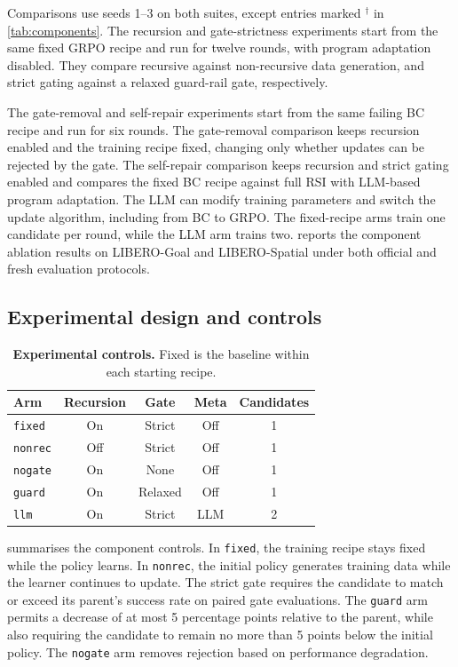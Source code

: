Comparisons use seeds 1--3 on both suites, except entries marked $^\dagger$ in \cref{tab:components}. The recursion and gate-strictness experiments start from the same fixed GRPO recipe and run for twelve rounds, with program adaptation disabled. They compare recursive against non-recursive data generation, and strict gating against a relaxed guard-rail gate, respectively.

The gate-removal and self-repair experiments start from the same failing BC recipe and run for six rounds. The gate-removal comparison keeps recursion enabled and the training recipe fixed, changing only whether updates can be rejected by the gate. The self-repair comparison keeps recursion and strict gating enabled and compares the fixed BC recipe against full RSI with LLM-based program adaptation. The LLM can modify training parameters and switch the update algorithm, including from BC to GRPO. The fixed-recipe arms train one candidate per round, while the LLM arm trains two.  reports the component ablation results on LIBERO-Goal and LIBERO-Spatial under both official and fresh evaluation protocols.

\subsection{Experimental design and controls}
\label{sec:controls}
\begin{table}[t]
\centering
\footnotesize
\caption{\textbf{Experimental controls.}
Fixed is the baseline within each starting recipe.}
\label{tab:controls}
\setlength{\tabcolsep}{5pt}
\renewcommand{\arraystretch}{1.15}
\begin{tabular}{@{}lcccc@{}}
\toprule
Arm & Recursion & Gate & Meta & Candidates \\
\midrule
\texttt{fixed}  & On  & Strict  & Off & 1 \\
\texttt{nonrec} & Off & Strict  & Off & 1 \\
\texttt{nogate} & On  & None    & Off & 1 \\
\texttt{guard}  & On  & Relaxed & Off & 1 \\
\texttt{llm}    & On  & Strict  & LLM & 2 \\
\bottomrule
\end{tabular}
\end{table}

 summarises the component controls. In \texttt{fixed}, the training recipe stays fixed while the policy learns. In \texttt{nonrec}, the initial policy generates training data while the learner continues to update.
The strict gate requires the candidate to match or exceed its parent's success rate on paired gate evaluations. The \texttt{guard} arm permits a decrease of at most 5 percentage points relative to the parent, while also
requiring the candidate to remain no more than 5 points below the initial policy. The \texttt{nogate} arm removes rejection based on performance degradation.

